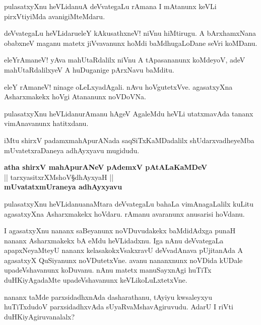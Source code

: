 \begin{mng}
pulasatxyXnu heVLidanu\mdash A deVvategaLu rAmana I mAtanunx keVLi pirxVtiyiMda avanigiMteMdaru.
\end{mng}

\begin{mng}
deVvategaLu heVLidaru\mdash eleY kAkusathxneV! niVnu hiMtirugu. A bArxhamxNana obabxneV maganu matetx jiVvavanunx hoMdi baMdhugaLoDane seVri koMDanu.
\end{mng}

\begin{mng}
eleYrAmaneV! yAva mahUtaRdalilx niVnu A tApasananunx koMdeyoV, adeV mahUtaRdalilxyeV A huDuganige pArxNavu baMditu.
\end{mng}

\begin{mng}
eleY rAmaneV! ninage oLeLxyadAgali. nAvu hoVgutetxVve. agasatxyXna Asharxmakekx hoVgi Atananunx noVDoVNa.
\end{mng}

\begin{mng}
pulasatxyXnu heVLidanu\mdash rAmanu hAgeV AgaleMdu heVLi utatxmavAda tananx vimAnavanunx hatitxdanu.
\end{mng}
iMtu shirxV padamxmahApurANada saqSiTxKaMDadalilx shUdarxvadheyeMba mUvatetxraDaneya adhAyxyavu mugidudu.

\begin{center}
\textbf{\Large atha shirxV mahApurANeV pAdemxV pAtALaKaMDeV}\\
|| tarxyasitxrXMshoV\S dhAyxyaH ||\\[20pt]
\textbf{mUvatatxmUraneya adhAyxyavu}
\end{center}

\begin{mng}
pulasatxyXnu heVLidanu\mdash anaMtara deVvategaLu bahaLa vimAnagaLalilx kuLitu agasatxyXna Asharxmakekx hoVdaru. rAmanu avaranunx anusarisi hoVdanu.
\end{mng}

\begin{mng}
I agasatxyXnu nananx saBeyanunx noVDuvudakekx baMdidAdxga punaH nananx Asharxmakekx bA eMdu heVLidadxnu. Iga nAnu deVvategaLa apapxNeyaMteyU nananx kelasakokxVsakxravU deVvadAnava pUjitanAda A agasatxyX QuSiyanunx noVDutetxVne. avanu nananxnunx noVDida kUDale upadeVshavanunx koDuvanu. nAnu matetx manuSayxnAgi huTiTx duHKiyAgadaMte upadeVshavanunx keVLikoLuLxtetxVne.
\end{mng}

\begin{mng}
nananx taMde parxsidadhxnAda dasharathanu, tAyiyu kwsaleyxyu huTiTxdudoV parxsidadhxvAda sUyaRvaMshavAgiruvudu. AdarU I riVti duHKiyAgiruvanalalx?
\end{mng}

